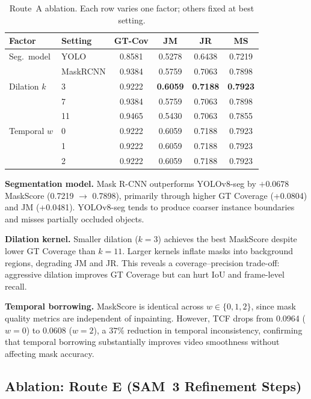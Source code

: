 \begin{table}[t]
\centering
\caption{Route~A ablation. Each row varies one factor; others fixed at best setting.}
\label{tab:ablation_a}
\setlength{\tabcolsep}{3pt}
\small
\begin{tabular}{p{1.4cm}p{1.5cm}cccc}
\toprule
Factor & Setting & GT-Cov & JM & JR & MS \\
\midrule
Seg.\ model & YOLO       & 0.8581 & 0.5278 & 0.6438 & 0.7219 \\
            & MaskRCNN   & 0.9384 & 0.5759 & 0.7063 & 0.7898 \\
\midrule
Dilation $k$ & 3  & 0.9222 & \textbf{0.6059} & \textbf{0.7188} & \textbf{0.7923} \\
             & 7  & 0.9384 & 0.5759 & 0.7063 & 0.7898 \\
             & 11 & 0.9465 & 0.5430 & 0.7063 & 0.7855 \\
\midrule
Temporal $w$ & 0 & 0.9222 & 0.6059 & 0.7188 & 0.7923 \\
             & 1 & 0.9222 & 0.6059 & 0.7188 & 0.7923 \\
             & 2 & 0.9222 & 0.6059 & 0.7188 & 0.7923 \\
\bottomrule
\end{tabular}
\end{table}

\textbf{Segmentation model.} Mask R-CNN outperforms YOLOv8-seg by $+0.0678$ MaskScore
(0.7219 $\to$ 0.7898), primarily through higher GT Coverage (+0.0804) and JM (+0.0481).
YOLOv8-seg tends to produce coarser instance boundaries and misses partially occluded
objects.

\textbf{Dilation kernel.} Smaller dilation ($k{=}3$) achieves the best MaskScore
despite lower GT Coverage than $k{=}11$. Larger kernels inflate masks into background
regions, degrading JM and JR. This reveals a coverage--precision trade-off: aggressive
dilation improves GT Coverage but can hurt IoU and frame-level recall.

\textbf{Temporal borrowing.} MaskScore is identical across $w \in \{0,1,2\}$, since
mask quality metrics are independent of inpainting. However, TCF drops from 0.0964
($w{=}0$) to 0.0608 ($w{=}2$), a $37\%$ reduction in temporal inconsistency,
confirming that temporal borrowing substantially improves video smoothness without
affecting mask accuracy.

\subsection{Ablation: Route E (SAM~3 Refinement Steps)}
\label{sec:exp:ablation_e}

